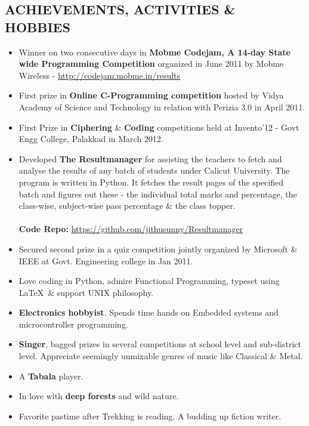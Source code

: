 \begin{resume}
\vspace*{+2mm}

\section{\sc \bf \textsf{ACHIEVEMENTS, ACTIVITIES \& HOBBIES}}
\begin{itemize}
\item Winner on two consecutive days in \textbf{Mobme Codejam, A 14-day State wide Programming Competition} organized in June 2011 by Mobme Wireless - \href{http://codejam.mobme.in/results}{\underline{http://codejam.mobme.in/results}}
\item First prize in \textbf{Online C-Programming competition} hosted by Vidya Academy of Science and Technology in relation with Perizia 3.0 in April 2011.
\item First Prize in \textbf{Ciphering} \& \textbf{Coding} competitions held at Invento'12 - Govt Engg College, Palakkad in March 2012.

\item Developed \textbf{The Resultmanager} for assisting the teachers to fetch and analyse the results of any batch of students under Calicut University. The program is written in Python. It fetches the result pages of the specified batch and figures out these - the individual total marks and percentage, the class-wise, subject-wise pass percentage \& the class topper.\\
\\ \textbf{Code Repo:} \href{https://github.com/jithusunny/Resultmanager}{\underline{https://github.com/jithusunny/Resultmanager}}

\item Secured second prize in a quiz competition jointly organized by Microsoft \& IEEE at Govt. Engineering college in Jan 2011.
\item Love coding in Python, admire Functional Programming, typeset using \LaTeX\ \& support UNIX philosophy.
\item \textbf{Electronics hobbyist}. Spends time hands on Embedded systems and microcontroller programming.
\item \textbf{Singer}, bagged prizes in several competitions at school level and sub-district level. Appreciate seemingly unmixable genres of music like Classical \& Metal.
\item A \textbf{Tabala} player.
\item In love with \textbf{deep forests} and wild nature.
\item Favorite pastime after Trekking is reading. A budding up fiction writer.
\end{itemize}


\end{resume}
